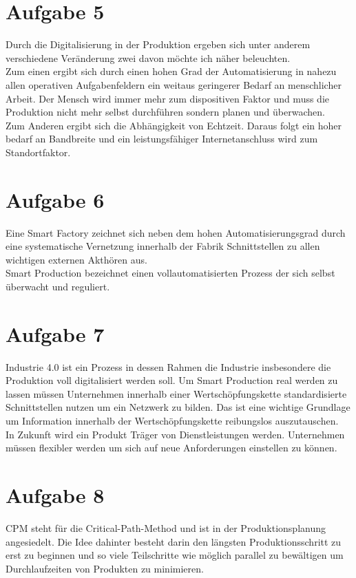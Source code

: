 \documentclass{article}
\begin{document}
	\section*{Aufgabe 5}
	Durch die Digitalisierung in der Produktion ergeben sich unter anderem verschiedene Veränderung zwei davon möchte ich näher beleuchten. \\
	Zum einen ergibt sich durch einen hohen Grad der Automatisierung in nahezu allen operativen Aufgabenfeldern ein weitaus geringerer Bedarf an menschlicher Arbeit. Der Mensch wird immer mehr zum dispositiven Faktor und muss die Produktion nicht mehr selbst durchführen sondern planen und überwachen. \\
	Zum Anderen ergibt sich die Abhängigkeit von Echtzeit. Daraus folgt ein hoher bedarf an Bandbreite und ein leistungsfähiger Internetanschluss wird zum Standortfaktor.
	\section*{Aufgabe 6}
	Eine Smart Factory zeichnet sich neben dem hohen Automatisierungsgrad durch eine systematische Vernetzung innerhalb der Fabrik Schnittstellen zu allen wichtigen externen Akthören aus. \\
	Smart Production bezeichnet einen vollautomatisierten Prozess der sich selbst überwacht und reguliert. 
	\section*{Aufgabe 7}
	Industrie 4.0 ist ein Prozess in dessen Rahmen die Industrie insbesondere die Produktion voll digitalisiert werden soll. Um Smart Production real werden zu lassen müssen Unternehmen innerhalb einer Wertschöpfungskette standardisierte Schnittstellen nutzen um ein Netzwerk zu bilden. Das ist eine wichtige Grundlage um Information innerhalb der Wertschöpfungskette reibungslos auszutauschen. \\
	In Zukunft wird ein Produkt Träger von Dienstleistungen werden. Unternehmen müssen flexibler werden um sich auf neue Anforderungen einstellen zu können.
	\section*{Aufgabe 8}
	CPM steht für die Critical-Path-Method und ist in der Produktionsplanung angesiedelt. Die Idee dahinter besteht darin den längsten Produktionsschritt zu erst zu beginnen und so viele Teilschritte wie möglich parallel zu bewältigen um Durchlaufzeiten von Produkten zu minimieren. 
\end{document}
